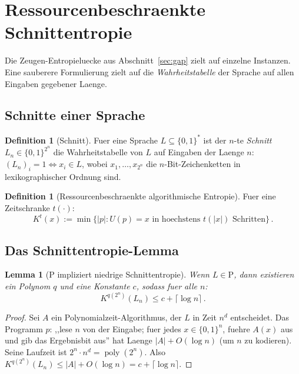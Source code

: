 \documentclass[aps,prd,twocolumn,superscriptaddress,nofootinbib]{revtex4-2}
\newtheorem{lemma}[theorem]{Lemma}
\theoremstyle{definition}
\newtheorem{definition}[theorem]{Definition}
\theoremstyle{remark}
\DeclareMathOperator{\poly}{poly}
\newcommand{\PP}{\mathrm{P}}
\begin{document}
\section{Ressourcenbeschraenkte Schnittentropie}
\label{sec:slices}

Die Zeugen-Entropieluecke aus Abschnitt~\ref{sec:gap} zielt auf einzelne Instanzen. Eine sauberere Formulierung zielt auf die \textit{Wahrheitstabelle} der Sprache auf allen Eingaben gegebener Laenge.

\subsection{Schnitte einer Sprache}

\begin{definition}[Schnitt]
Fuer eine Sprache $L \subseteq \{0,1\}^*$ ist der $n$-te \textit{Schnitt} $L_n \in \{0,1\}^{2^n}$ die Wahrheitstabelle von $L$ auf Eingaben der Laenge $n$: $(L_n)_i = 1 \iff x_i \in L$, wobei $x_1, \ldots, x_{2^n}$ die $n$-Bit-Zeichenketten in lexikographischer Ordnung sind.
\end{definition}

\begin{definition}[Ressourcenbeschraenkte algorithmische Entropie]
Fuer eine Zeitschranke $t(\cdot)$:
\begin{equation}
K^t(x) := \min\{|p| : U(p) = x \text{ in hoechstens } t(|x|) \text{ Schritten}\}\,.
\label{eq:Kt}
\end{equation}
\end{definition}

\subsection{Das Schnittentropie-Lemma}

\begin{lemma}[P impliziert niedrige Schnittentropie]
\label{lem:p_low_entropy}
Wenn $L \in \PP$, dann existieren ein Polynom $q$ und eine Konstante $c$, sodass fuer alle $n$:
\begin{equation}
K^{q(2^n)}(L_n) \leq c + \lceil \log n \rceil\,.
\label{eq:p_entropy}
\end{equation}
\end{lemma}

\begin{proof}
Sei $A$ ein Polynomialzeit-Algorithmus, der $L$ in Zeit $n^d$ entscheidet. Das Programm $p$: ,,lese $n$ von der Eingabe; fuer jedes $x \in \{0,1\}^n$, fuehre $A(x)$ aus und gib das Ergebnisbit aus'' hat Laenge $|A| + O(\log n)$ (um $n$ zu kodieren). Seine Laufzeit ist $2^n \cdot n^d = \poly(2^n)$. Also $K^{q(2^n)}(L_n) \leq |A| + O(\log n) = c + \lceil \log n \rceil$.
\end{proof}
\end{document}
